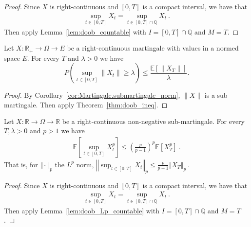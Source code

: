\begin{proof}
Since $X$ is right-continuous and $[0,T]$ is a compact interval, we have that
\begin{align*}
  \sup_{t\in[0,T]}X_t = \sup_{t\in[0,T] \cap \mathbb{Q}}X_t
  \: .
\end{align*}
Then apply Lemma~\ref{lem:doob_countable} with $I = [0,T] \cap \mathbb{Q}$ and $M = T$.
\end{proof}


\begin{corollary}\label{cor:doob_ineq_norm}
  \leanok
  Let $X:\mathbb{R}_+ \to \Omega \to E$ be a right-continuous martingale with values in a normed space $E$.
  For every $T$ and $\lambda>0$ we have
  $$
  P\left( \sup_{t\in[0,T]} \lVert X_t \rVert \geq \lambda \right)
  \leq \frac{\mathbb{E}[\lVert X_T \rVert]}{\lambda}.
  $$
\end{corollary}

\begin{proof}
  By Corollary~\ref{cor:Martingale.submartingale_norm}, $\lVert X \rVert$ is a sub-martingale.
  Then apply Theorem~\ref{thm:doob_ineq}.
\end{proof}


\begin{theorem}\label{thm:doob_lp}
  Let $X:\mathbb{R} \rightarrow \Omega \rightarrow \mathbb{R}$ be a right-continuous non-negative sub-martingale.
  For every $T, \lambda>0$ and $p>1$ we have
  \begin{align*}
    \mathbb{E}\left[ \sup_{t\in[0,T]}X_t^p \right]
    \leq \left(\frac{p}{p-1}\right)^p\mathbb{E}[X_T^p]
    \: .
  \end{align*}
  That is, for $\Vert \cdot \Vert_p$ the $L^p$ norm,
  $\left\Vert \sup_{t\in[0,T]}  X_t  \right\Vert_p
    \leq \frac{p}{p-1} \left\Vert X_T \right\Vert_p
    \: .$
\end{theorem}

\begin{proof}
Since $X$ is right-continuous and $[0,T]$ is a compact interval, we have that
\begin{align*}
  \sup_{t\in[0,T]}X_t = \sup_{t\in[0,T] \cap \mathbb{Q}}X_t
  \: .
\end{align*}
Then apply Lemma~\ref{lem:doob_Lp_countable} with $I = [0,T] \cap \mathbb{Q}$ and $M = T$.
\end{proof}


